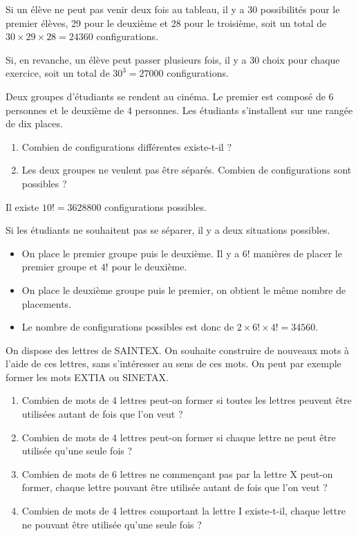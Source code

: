 \documentclass[11pt,fleqn, openany]{book} %
\begin{document}
\begin{solution}Si un élève ne peut pas venir deux fois au tableau, il y a 30 possibilités pour le premier élèves, 29 pour le deuxième et 28 pour le troisième, soit un total de $30 \times 29 \times 28=24360$ configurations.

Si, en revanche, un élève peut passer plusieurs fois, il y a 30 choix pour chaque exercice, soit un total de $30^3=27000$ configurations.\newpage \end{solution}



\begin{exercise}[topic=comb02]Deux groupes d'étudiants se rendent au cinéma. Le premier est composé de 6 personnes et le deuxième de 4 personnes. Les étudiants s'installent sur une rangée de dix places.
\begin{enumerate}
\item Combien de configurations différentes existe-t-il ?
\item Les deux groupes ne veulent pas être séparés. Combien de configurations sont possibles ?
\end{enumerate}\end{exercise}

\begin{solution}Il existe $10!=3628800$ configurations possibles.

Si les étudiants ne souhaitent pas se séparer, il y a deux situations possibles.
\begin{itemize}
\item On place le premier groupe puis le deuxième. Il y a $6!$ manières de placer le premier groupe et $4!$ pour le deuxième.
\item On place le deuxième groupe puis le premier, on obtient le même nombre de placements.
\item Le nombre de configurations possibles est donc de $2 \times 6! \times 4! = 34560$.
\end{itemize}\end{solution}




\begin{exercise}[topic=comb02]
On dispose des lettres de SAINTEX. On souhaite construire de nouveaux mots à l'aide de ces lettres, sans s'intéresser au sens de ces mots. On peut par exemple former les mots EXTIA ou SINETAX.
\begin{enumerate}
\item Combien de mots de 4 lettres peut-on former si toutes les lettres peuvent être utilisées autant de fois que l'on veut ?
\item Combien de mots de 4 lettres peut-on former si chaque lettre ne peut être utilisée qu'une seule fois ?
\item Combien de mots de 6 lettres ne commençant pas par la lettre X peut-on former, chaque lettre pouvant être utilisée autant de fois que l'on veut ?
\item Combien de mots de 4 lettres comportant la lettre I existe-t-il, chaque lettre ne pouvant être utilisée qu'une seule fois ?
\end{enumerate}\end{exercise}
\end{document}
